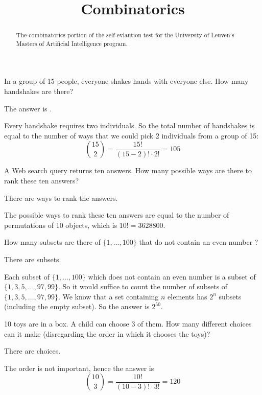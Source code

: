 \documentclass{ximera}
\title{Combinatorics}
\begin{document}
\begin{abstract}
The combinatorics portion of the self-evlaution test for the
University of Leuven's Masters of Artificial Intelligence program.
\end{abstract}
\maketitle



\begin{question}
In a group of 15 people, everyone shakes hands with everyone else.
How many handshakes are there?
\begin{solution}
The answer is .
\end{solution}
Every handshake requires two individuals. So the total number of
handshakes is equal to the number of ways that we could pick 2
individuals from a group of 15:
\[
\binom{15}{2} = \frac{15!}{(15 - 2)! \cdot 2!} = 105
\]
\end{question}

\begin{question}
A Web search query returns ten answers. How many possible ways are
there to rank these ten answers?
\begin{solution}
There are  ways to rank the answers.
\end{solution}
The possible ways to rank these ten answers are equal to the number of
permutations of 10 objects, which is $10! = 3628800$.
\end{question}

\begin{question}
How many subsets are there of $\{1, ... , 100\}$ that do not contain
an even number ?
\begin{solution}
There are  subsets.
\end{solution}
Each subset of $\{1 , \ldots , 100\}$ which does not contain an even
number is a subset of $\{1, 3, 5, \ldots , 97, 99\}$. So it would
suffice to count the number of subsets of $\{1, 3, 5, \ldots , 97,
99\}$. We know that a set containing $n$ elements has $2^n$ subsets
(including the empty subset). So the answer is $2^{50}$.
\end{question}

\begin{question}
10 toys are in a box.  A child can choose 3 of them.  How many
different choices can it make (disregarding the order in which it
chooses the toys)?
\begin{solution}
There are  choices.
\end{solution}
The order is not important, hence the answer is
\[
\binom{10}{3} = \frac{10!}{(10-3)! \cdot 3!} = 120
\]
\end{question}
\end{document}
